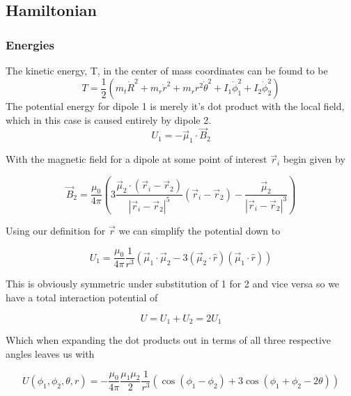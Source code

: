 \documentclass[12pt]{amsart}
\begin{document}
\subsection{Hamiltonian}
\subsubsection{Energies}
The kinetic energy, T, in the center of mass coordinates can be found to be
\begin{equation}
T = \frac{1}{2}(
	m_t \dot R^2
	+m_r \dot r^2
	+m_r r^2 \dot \theta^2
	+ I_1 \dot \phi_1^2
	+ I_2 \dot \phi_2^2
)
\end{equation}
The potential energy for dipole 1 is merely it's dot product with the local field, which in this case is caused entirely by dipole 2.
\begin{equation}
U_1 = -\vec \mu_1 \cdot \vec B_2
\end{equation}

With the magnetic field for a dipole at some point of interest $\vec r_i$ begin given by

\begin{equation}
\vec B_2 = 
\frac{\mu_0}{4\pi}(
	3\frac{\vec \mu_2 \cdot (\vec r_i - \vec r_2)}{|\vec r_i - \vec r_2|^5}(
	\vec r_i - \vec r_2
	)
	-\frac{\vec \mu_2}{|\vec r_i - \vec r_2|^3}
)
\end{equation}

Using our definition for $\vec r$ we can simplify the potential down to

\begin{equation}
U_1 = 
\frac{\mu_0}{4\pi}
\frac{1}{r^3}(
	\vec \mu_1 \cdot \vec \mu_2
	-3(
		\vec \mu_2 \cdot \hat r
		)(
		\vec \mu_1 \cdot \hat r		
		)
)
\end{equation}

This is obviously symmetric under substitution of 1 for 2 and vice versa so we have a total interaction potential of

\begin{equation}
U =
U_1+U_2
= 
2U_1
\end{equation}

Which when expanding the dot products out in terms of all three respective angles leaves us with

\begin{equation}
U(\phi_1, \phi_2, \theta, r) =
-\frac{\mu_0}{4\pi}
\frac{\mu_1 \mu_2}{2}
\frac{1}{r^3}(
	\cos(\phi_1-\phi_2)
	+3\cos(\phi_1+\phi_2 -2\theta)
)
\end{equation}
\end{document}
